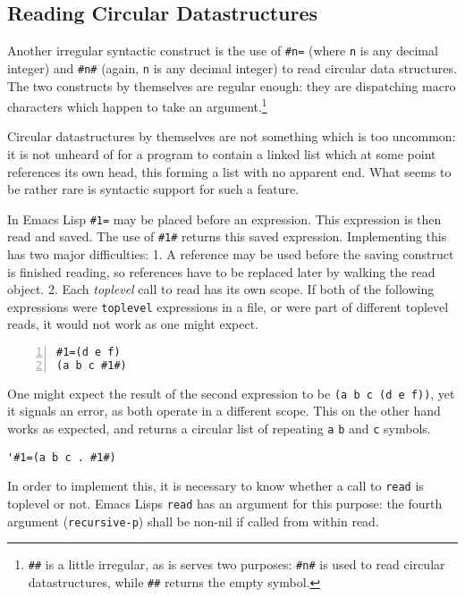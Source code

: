 \documentclass[a4paper,10pt,twoside]{report}
\newcommand{\el}{Emacs Lisp}
\newcommand{\sym}[1]{\texttt{#1}}
\newcommand{\fun}[1]{\texttt{#1}}
\newcommand{\Read}{\fun{read}}
\begin{document}
\subsection{Reading Circular Datastructures}
\label{subsec:circular-datastructures}

Another irregular syntactic construct is the use of \texttt{\#n=} (where
\texttt{n} is any decimal integer) and \texttt{\#n\#} (again, \texttt{n} is any
decimal integer) to read circular data structures.  The two constructs by
themselves are regular enough: they are dispatching macro characters which
happen to take an argument.\footnote{\texttt{\#\#} is a little irregular, as is
  serves two purposes: \texttt{\#n\#} is used to read circular datastructures,
  while \texttt{\#\#} returns the empty symbol.}

Circular datastructures by themselves are not something which is too uncommon:
it is not unheard of for a program to contain a linked list which at some point
references its own head, this forming a list with no apparent end.  What seems
to be rather rare is syntactic support for such a feature.

In \el{} \texttt{\#1=} may be placed before an expression.  This expression is
then read and saved.  The use of \texttt{\#1\#} returns this saved expression.
Implementing this has two major difficulties:  1. A reference may be used before
the saving construct is finished reading, so references have to be replaced
later by walking the read object.  2. Each \emph{toplevel} call to read has its
own scope.  If both of the following expressions were \texttt{toplevel}
expressions in a file, or were part of different toplevel reads, it would not
work as one might expect.

\begin{lstlisting}[style=lispcode,label={code:circular-toplevel-broken},caption={This
  does not work as expected},numbers=left]
#1=(d e f)
(a b c #1#)
\end{lstlisting}

One might expect the result of the second expression to be \texttt{(a b c (d e
  f))}, yet it signals an error, as both operate in a different scope.  This on
the other hand works as expected, and returns a circular list of repeating
\texttt{a} \texttt{b} and \texttt{c} symbols.

\begin{lstlisting}[style=lispinline]
  '#1=(a b c . #1#)
\end{lstlisting}

In order to implement this, it is necessary to know whether a call to \Read{} is
toplevel or not.  \el{}s \Read{} has an argument for this purpose: the fourth
argument (\sym{recursive-p}) shall be non-nil if called from within read.
\end{document}
